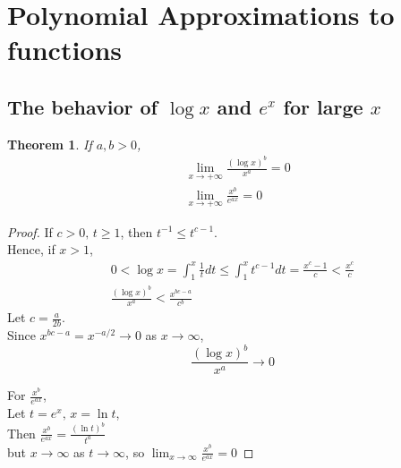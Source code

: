 \documentclass[twoside]{amsart}
\theoremstyle{plain}
\newtheorem{theorem}{Theorem}
\theoremstyle{definition}
\begin{document}
\section{ Polynomial Approximations to functions }

\subsection{ The behavior of $\log{x}$ and $e^x$ for large $x$ }

\begin{theorem} If $a,b >0$, 
\begin{align}
  & \lim_{x \to +\infty} \frac{ (\log{x})^b}{ x^a } = 0 \\
  & \lim_{x \to +\infty} \frac{ x^b}{ e^{ax}} = 0 
\end{align}
\end{theorem}
\begin{proof}
  If $c > 0, \, t \geq 1$, then $t^{-1} \leq t^{c-1}$.  \medskip \\
  Hence, if $x>1$, 
\[
\begin{gathered}
  0 < \log{x} = \int_1^x \frac{1}{t} dt \leq \int_1^x t^{c-1} dt = \frac{x^c - 1 }{ c } < \frac{x^c }{c}  \\
  \frac{ (\log{x} )^b }{ x^a } < \frac{ x^{bc-a}}{ c^b} 
\end{gathered}
\]
Let $c = \frac{a}{2b}$.  \medskip \\
\phantom{ Let } Since $x^{bc-a} = x^{-a/2} \to 0$ as $x\to \infty$, 
\[
\frac{ (\log{x})^b }{ x^a } \to 0
\]

For $\frac{ x^b}{ e^{ax}}$, \medskip \\
Let $t=e^x, \, x = \ln{t}$, \medskip \\
\phantom{ Let } Then $\frac{ x^b}{e^{ax}} = \frac{ (\ln{t})^b}{ t^a } $ \\
\phantom{ Let Then } but $x\to \infty$ as $t\to \infty$, so $\lim_{x\to \infty} \frac{x^b}{ e^{ax}} = 0 $
\end{proof}

\end{document}
